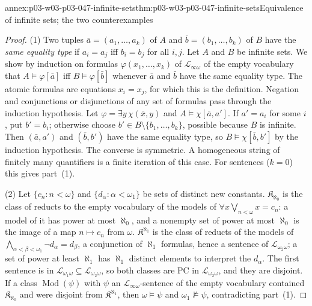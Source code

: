 \begin{annexitem}{annex:p03-w03-p03-047-infinite-sets}{thm:p03-w03-p03-047-infinite-sets}{Equivalence of infinite sets; the two counterexamples}
\begin{proof}
(1) Two tuples \(\bar a=(a_1,\dots,a_k)\) of \(A\) and
\(\bar b=(b_1,\dots,b_k)\) of \(B\) have the \emph{same equality type} if
\(a_i=a_j\) iff \(b_i=b_j\) for all \(i,j\).  Let \(A\) and \(B\) be infinite
sets.  We show by induction on formulas \(\varphi(x_1,\dots,x_k)\) of
\(\mathscr L_{\infty\omega}\) of the empty vocabulary that
\(A\models\varphi[\bar a]\) iff \(B\models\varphi[\bar b]\) whenever
\(\bar a\) and \(\bar b\) have the same equality type.  The atomic formulas
are equations \(x_i=x_j\), for which this is the definition.  Negation and
conjunctions or disjunctions of any set of formulas pass through the
induction hypothesis.  Let \(\varphi=\exists y\,\chi(\bar x,y)\) and
\(A\models\chi[\bar a,a']\).  If \(a'=a_i\) for some \(i\), put \(b'=b_i\);
otherwise choose \(b'\in B\setminus\{b_1,\dots,b_k\}\), possible because
\(B\) is infinite.  Then \((\bar a,a')\) and \((\bar b,b')\) have the same
equality type, so \(B\models\chi[\bar b,b']\) by the induction hypothesis.
The converse is symmetric.  A homogeneous string of finitely many
quantifiers is a finite iteration of this case.  For sentences
(\(k=0\)) this gives part~(1).

(2) Let \(\{c_n:n<\omega\}\) and \(\{d_\alpha:\alpha<\omega_1\}\) be sets of
distinct new constants.  \(\mathfrak K_{\aleph_0}\) is the class of
reducts to the empty vocabulary of the models of
\(\forall x\bigvee_{n<\omega}x=c_n\): a model of it has power at most
\(\aleph_0\), and a nonempty set of power at most \(\aleph_0\) is the image
of a map \(n\mapsto c_n\) from \(\omega\).  \(\mathfrak K^{\aleph_1}\) is
the class of reducts of the models of
\(\bigwedge_{\alpha<\beta<\omega_1}\neg d_\alpha=d_\beta\), a conjunction of
\(\aleph_1\) formulas, hence a sentence of \(\mathscr L_{\omega_2\omega}\);
a set of power at least \(\aleph_1\) has \(\aleph_1\) distinct elements to
interpret the \(d_\alpha\).  The first sentence is in
\(\mathscr L_{\omega_1\omega}\subseteq\mathscr L_{\omega_2\omega}\), so both
classes are PC in \(\mathscr L_{\omega_2\omega}\), and they are disjoint.
If a class \(\operatorname{Mod}(\psi)\) with \(\psi\) an
\(\mathscr L_{\infty\omega}\)-sentence of the empty vocabulary contained
\(\mathfrak K_{\aleph_0}\) and were disjoint from
\(\mathfrak K^{\aleph_1}\), then \(\omega\models\psi\) and
\(\omega_1\not\models\psi\), contradicting part~(1).


\end{proof}
\end{annexitem}

